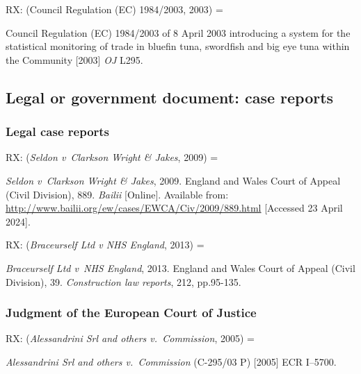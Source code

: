 RX: (Council Regulation (EC) 1984/2003, 2003) = \cite{eu.dir1984/2003}

Council Regulation (EC) 1984/2003 of 8 April 2003 introducing a system for the statistical monitoring of trade in bluefin tuna, swordfish and big eye tuna within the Community [2003] \emph{OJ} L295.



\subsection{Legal or government document: case reports}

\subsubsection*{Legal case reports}

RX: (\emph{Seldon v~Clarkson Wright \& Jakes}, 2009) = \cite{seldon-v-c.w.j2009}

\emph{Seldon v~Clarkson Wright \& Jakes}, 2009. England and Wales Court of Appeal (Civil Division), 889. \emph{Bailii} [Online]. Available from: \url{http://www.bailii.org/ew/cases/EWCA/Civ/2009/889.html} [Accessed 23 April 2024].


RX: (\emph{Braceurself Ltd v NHS England}, 2013) = \cite{braceurself-v-nhs.england2013}

\emph{Braceurself Ltd v~NHS England}, 2013. England and Wales Court of Appeal (Civil Division), 39. \emph{Construction law reports}, 212, pp.95-135.


\subsubsection*{Judgment of the European Court of Justice}

RX: (\emph{Alessandrini Srl and others v.~Commission}, 2005) = \cite{srl.etal-v-comm2005}

\emph{Alessandrini Srl and others v.~Commission} (C-295/03 P) [2005] ECR I--5700.


